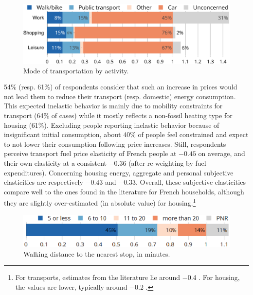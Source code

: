 \documentclass[english,5p,authoryear]{elsarticle}
\begin{document}
\begin{figure}[b]
\centering
\includegraphics[width=\columnwidth]{Images_EPS/transports_use_trim.eps}
\caption{Mode of transportation by activity.}
\label{fig:transports_use}
\end{figure}

%
54\% (resp. 61\%) of respondents consider that such an increase in prices would not lead them to reduce their transport (resp. domestic) energy consumption. This expected inelastic behavior is mainly due to mobility constraints for transport (64\% of cases) while it mostly reflects a non-fossil heating type for housing (61\%). Excluding people reporting inelastic behavior because of insignificant initial consumption, about 40\% of people feel constrained and expect to not lower their consumption following price increases. Still, respondents perceive transport fuel price elasticity of French people at $-0.45$ on average, and their own elasticity at a consistent $-0.36$ (after re-weighting by fuel expenditures). Concerning housing energy, aggregate and personal subjective elasticities are respectively $-0.43$ and $-0.33$. Overall, these subjective elasticities compare well to the ones found in the literature for French households, although they are slightly over-estimated (in absolute value) for housing.\footnote{For transports, estimates from the literature lie around $-$0.4 \citep{clerc_marcus,bureau_distributional_2011,douenne_vertical_2018}. For housing, the values are lower, typically around $-$0.2 \citep{douenne_vertical_2018,clerc_marcus}.}

%

%

%

%

%

\begin{figure}[t]
\centering
\includegraphics[width=\columnwidth]{Images_EPS/transports_distance_trim.eps}
\caption{Walking distance to the nearest stop, in minutes.}
\label{fig:transports_distance}
\end{figure}
\end{document}
